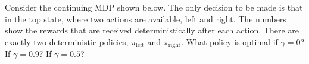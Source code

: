 
\begin{exercise}[Exercise 3.22]

Consider the continuing MDP shown below. The only decision to be made is that in
the top state, where two actions are available, left and right. The numbers show
the rewards that are received deterministically after each action. There are
exactly two deterministic policies, $\pi_{\text{left}}$ and $\pi_{\text{right}}$.
What policy is optimal if $\gamma = 0$? If $\gamma = 0.9?$ If $\gamma = 0.5$?


\end{exercise}


